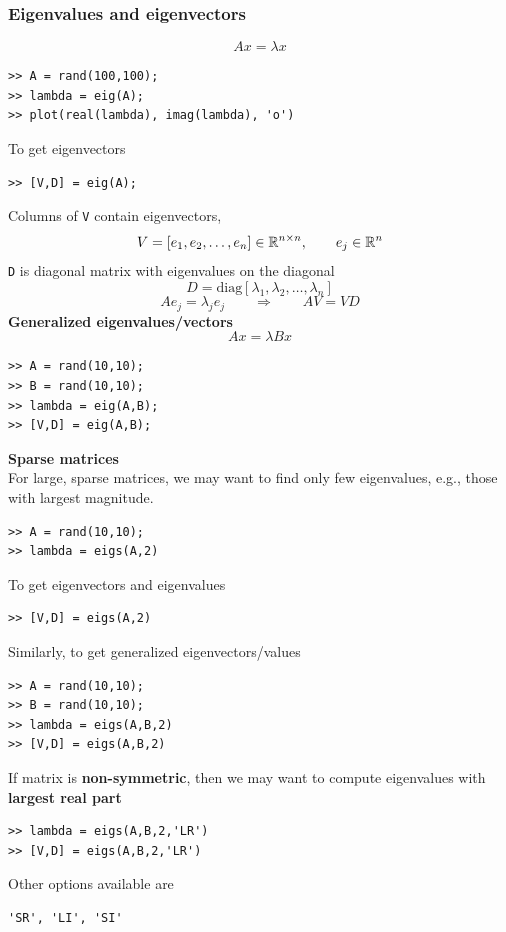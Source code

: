 \documentclass[11pt,xcolor=svgnames,onlymath]{beamer}
\begin{document}
\begin{frame}
\frametitle{Eigenvalues and eigenvectors}

\[
A x = \lambda x
\]

\begin{lstlisting}
>> A = rand(100,100);
>> lambda = eig(A);
>> plot(real(lambda), imag(lambda), 'o')
\end{lstlisting}

To get eigenvectors
\begin{lstlisting}
>> [V,D] = eig(A);
\end{lstlisting}
Columns of {\tt V} contain eigenvectors, 
\[
V = [e_1, e_2, \ldots, e_n] \in \mathbb{R}^{n \times n}, \qquad e_j \in \mathbb{R}^n
\]
{\tt D} is diagonal matrix with eigenvalues on the diagonal
\[
D = \mbox{diag}[\lambda_1, \lambda_2, \ldots, \lambda_n]
\]
\[
Ae_j = \lambda_j e_j \qquad \Longrightarrow \qquad A V = V D
\]
{\bf Generalized eigenvalues/vectors}
\[
Ax = \lambda Bx
\]
\begin{lstlisting}
>> A = rand(10,10);
>> B = rand(10,10);
>> lambda = eig(A,B);
>> [V,D] = eig(A,B);
\end{lstlisting}

\vspace{2mm}

{\bf Sparse matrices}\\
For large, sparse matrices, we may want to find only few eigenvalues, e.g., those with largest magnitude.
\begin{lstlisting}
>> A = rand(10,10);
>> lambda = eigs(A,2)
\end{lstlisting}
To get eigenvectors and eigenvalues
\begin{lstlisting}
>> [V,D] = eigs(A,2)
\end{lstlisting}
Similarly, to get generalized eigenvectors/values
\begin{lstlisting}
>> A = rand(10,10);
>> B = rand(10,10);
>> lambda = eigs(A,B,2)
>> [V,D] = eigs(A,B,2)
\end{lstlisting}

If matrix is {\bf non-symmetric}, then we may want to compute eigenvalues with {\bf largest real part}
\begin{lstlisting}
>> lambda = eigs(A,B,2,'LR')
>> [V,D] = eigs(A,B,2,'LR')
\end{lstlisting}
Other options available are
\begin{lstlisting}
'SR', 'LI', 'SI'
\end{lstlisting}

\end{frame}
\end{document}
